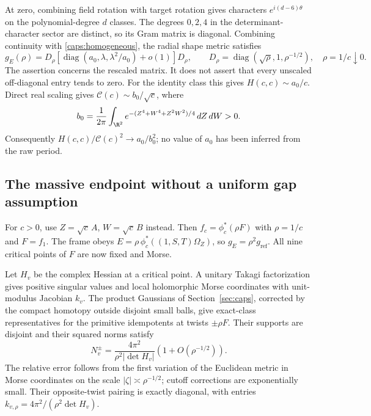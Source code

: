 At zero, combining field rotation with target rotation gives
characters $e^{i(d-6)\theta}$ on the polynomial-degree $d$ classes.
The degrees $0,2,4$ in the determinant-character sector are distinct,
so its Gram matrix is diagonal. Combining continuity with
\eqref{caps:homogeneous}, the radial shape metric satisfies
\begin{equation}\label{end:small-rho}
g_E(\rho)=D_\rho\left[
 \operatorname{diag}(a_0,\lambda,\lambda^2/a_0)+o(1)\right]D_\rho,
\qquad
D_\rho=\operatorname{diag}(\sqrt\rho,1,\rho^{-1/2}),
\quad \rho=1/c\downarrow0.
\end{equation}
The assertion concerns the rescaled matrix. It does not assert that
every unscaled off-diagonal entry tends to zero.
For the identity class this gives
$H(c,c)\sim a_0/c$. Direct real scaling gives
$\mathcal C(c)\sim b_0/\sqrt c$, where
\[
b_0=\frac1{2\pi}\int_{\R^2}
 e^{-(Z^4+W^4+Z^2W^2)/4}\,dZ\,dW>0.
\]
Consequently $H(c,c)/\mathcal C(c)^2\to a_0/b_0^2$; no value of $a_0$ has
been inferred from the raw period.

\subsection{The massive endpoint without a uniform gap assumption}
For $c>0$, use $Z=\sqrt c\,A$, $W=\sqrt c\,B$ instead. Then
$f_c=\phi_c^*(\rho F)$ with $\rho=1/c$ and $F=f_1$.
The frame obeys
$E=\rho\,\phi_c^*((1,S,T)\Omega_Z)$, so
$g_E=\rho^2g_{\mathrm{ref}}$. All nine critical points of $F$
are now fixed and Morse.

Let $H_v$ be the complex Hessian at a critical point. A unitary
Takagi factorization gives positive singular values and local
holomorphic Morse coordinates with unit-modulus Jacobian $k_v$.
The product Gaussians of Section~\ref{sec:caps}, corrected by the
compact homotopy outside disjoint small balls, give exact-class
representatives for the primitive idempotents at twists $\pm\rho F$.
Their supports are disjoint and their squared norms satisfy
\[
N_v^\pm=\frac{4\pi^2}{\rho^2|\det H_v|}
                 (1+O(\rho^{-1/2})).
\]
The relative error follows from the first variation of the
Euclidean metric in Morse coordinates on the scale
$|\zeta|\asymp\rho^{-1/2}$; cutoff corrections are exponentially
small. Their opposite-twist pairing is exactly diagonal, with
entries
$k_{v,\rho}=4\pi^2/(\rho^2\det H_v)$.

